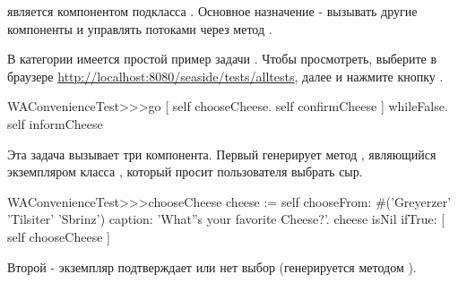 \documentclass[a4paper,10pt,twoside]{book}
\begin{document}

 является компонентом подкласса .
Основное назначение - вызывать другие компоненты и управлять потоками
через метод .


В категории  имеется простой пример задачи
.
Чтобы просмотреть,
выберите в браузере \url{http://localhost:8080/seaside/tests/alltests},
далее  и нажмите кнопку .

\begin{code}{}
WAConvenienceTest>>>go
	[ self chooseCheese.
	  self confirmCheese ] whileFalse.
	self informCheese
\end{code}


Эта задача вызывает три компонента.
Первый генерирует метод ,
являющийся экземпляром класса ,
который просит пользователя выбрать сыр.

\begin{code}{}
WAConvenienceTest>>>chooseCheese
	cheese := self
		chooseFrom: #('Greyerzer' 'Tilsiter' 'Sbrinz')
		caption: 'What''s your favorite Cheese?'.
	cheese isNil ifTrue: [ self chooseCheese ]
\end{code}



Второй - экземпляр  подтверждает или нет выбор
(генерируется методом ). 
\end{document}
